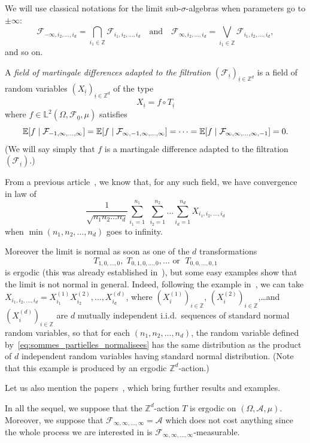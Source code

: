\documentclass[AHL,Unicode,longabstracts,published]{cedram}
\newcommand{\Z}{\mathbb{Z}}
\newcommand*\bbL{\mathbb{L}}
\newcommand{\bbE}{\mathbb{E}}
\newcommand{\E}[1]{\bbE\left[#1\right]}
\newcommand*\A{\mathcal{A}}
\newcommand*\F{\mathcal{F}}
\let\originalleft\left
\let\originalright\right
\renewcommand{\left}{\mathopen{}\mathclose\bgroup\originalleft}
\renewcommand{\right}{\aftergroup\egroup\originalright}
\begin{document}
We will use classical notations for the limit sub-$\sigma$-algebras when parameters go to $\pm\infty$:
\[
\F_{-\infty,i_2,\dots,i_d}=\bigcap_{i_1\in\Z}\F_{i_1,i_2,\dots,i_d}\quad\text{and}\quad\F_{\infty,i_2,\dots,i_d}=\bigvee_{i_1\in\Z}\F_{i_1,i_2,\dots,i_d},
\]
and so on.

A \emph{field of martingale differences adapted to the filtration} $(\F_{\underline{i}})_{\underline{i}\in\Z^d}$ is a field of random variables $(X_{\underline{i}})_{\underline{i}\in\Z^d}$ of the type
\[
X_{\underline{i}}=f\circ T_{\underline{i}}
\]
where $f\in \bbL^2(\Omega,\F_{\underline{0}},\mu)$ satisfies
\begin{equation}\label{eq:cond-mart}
\E{f\mid\F_{-1,\infty,\dots,\infty}}=\E{f\mid\F_{\infty,-1,\infty,\dots,\infty}}=\dots=\E{f\mid\F_{\infty,\infty,\dots,\infty,-1}}=0.
\end{equation}
(We will say simply that $f$ is a martingale difference adapted to the filtration $(\F_{\underline{i}})$.)

From a previous article~\cite{MR3913270}, we know that, for any such field, we have convergence in law of
\begin{equation}\label{eq:sommes_partielles_normalisees}
\frac1{\sqrt{n_1n_2\dots n_d}}\sum_{i_1=1}^{n_1}\;\sum_{i_2=1}^{n_2}\dots\sum_{i_d=1}^{n_d} X_{i_1,i_2,\dots,i_d}
\end{equation}
when $\min(n_1,n_2,\dots,n_d)$ goes to infinity.

Moreover the limit is normal as soon as one of the $d$ transformations
\[
T_{1,0,\dots,0},
\; T_{0,1,0,\dots,0},\dots \text{ or }\;T_{0,0,\dots,0,1}
\]
is ergodic (this was already established in~\cite{MR3427925}), but some easy examples show that the limit is not normal in general. Indeed, following the example in~\cite{MR3222815}, we can take $X_{i_1,i_2,\dots,i_d}=X^{(1)}_{i_1}X^{(2)}_{i_2},\dots, X^{(d)}_{i_d}$, where $(X^{(1)}_i)_{i\in\Z}$, $(X^{(2)}_i)_{i\in\Z}$,\dots and $(X^{(d)}_i)_{i\in\Z}$ are $d$ mutually independent i.i.d.\ sequences of standard normal random variables, so that for each $(n_1,n_2, \dots,n_d)$, the random variable defined by~\eqref{eq:sommes_partielles_normalisees} has the same distribution as the product of $d$ independent random variables having standard normal distribution. (Note that this example is produced by an ergodic $\Z^d$-action.)


Let us also mention the papers~\cite{MR3504508,MR3869881}, which bring further results and examples.

{In all the sequel, we suppose that the $\Z^d$-action $T$ is ergodic on $(\Omega,\A,\mu)$. Moreover, we suppose that $\F_{\infty,\infty,\dots,\infty}=\A$ which does not cost anything since the whole process we are interested in is $\F_{\infty,\infty,\dots,\infty}$-measurable.}
\end{document}
